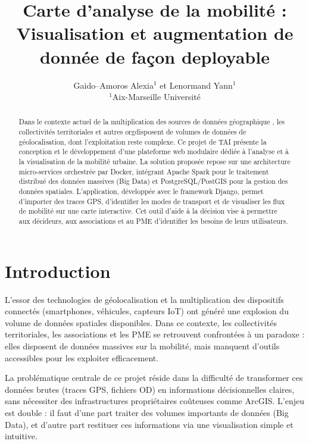 \documentclass[french]{tai_info} %
\title[Carte d’analyse de la mobilité]{Carte d’analyse de la mobilité :\\
Visualisation et augmentation de donnée de façon deployable }
\author[Gaido--Amoros Alexia et Lenormand Yann]%
       {Gaido--Amoros Alexia$^1$
        et Lenormand Yann$^1$
        \\
         $^1$Aix-Marseille Université
       }
\begin{document}
\maketitle

\begin{abstract}
    Dans le contexte actuel de la multiplication des sources de données géographique , les collectivités territoriales et autres orgdisposent de volumes de données de géolocalisation, dont l'exploitation reste complexe. 
    Ce projet de TAI présente la conception et le développement d'une plateforme web modulaire dédiée à l'analyse et à la visualisation de la mobilité urbaine. 
    \newline \newline
    La solution proposée repose sur une architecture micro-services orchestrée par Docker, intégrant Apache Spark pour le traitement distribué des données massives (Big Data) et PostgreSQL/PostGIS pour la gestion des données spatiales. 
    L'application, développée avec le framework Django, permet d'importer des traces GPS, d'identifier les modes de transport et de visualiser les flux de mobilité sur une carte interactive. 
    Cet outil d'aide à la décision vise à permettre aux décideurs, aux associations et au PME d'identifier les besoins de leurs utilisateurs.
\end{abstract}



\section{Introduction}

L'essor des technologies de géolocalisation et la multiplication des dispositifs connectés (smartphones, véhicules, capteurs IoT) ont généré une explosion du volume de données spatiales disponibles. Dans ce contexte, les collectivités territoriales, les associations et les PME se retrouvent confrontées à un paradoxe : elles disposent de données massives sur la mobilité, mais manquent d'outils accessibles pour les exploiter efficacement.

La problématique centrale de ce projet réside dans la difficulté de transformer ces données brutes (traces GPS, fichiers OD) en informations décisionnelles claires, sans nécessiter des infrastructures propriétaires coûteuses comme ArcGIS. L'enjeu est double : il faut d'une part traiter des volumes importants de données (Big Data), et d'autre part restituer ces informations via une visualisation simple et intuitive.
\end{document}
